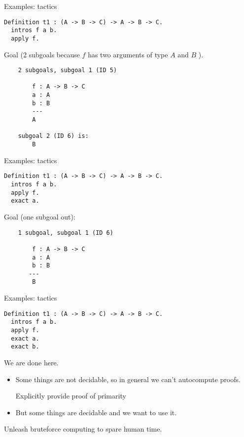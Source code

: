 \documentclass{beamer}
\begin{document}
\begin{frame}[fragile]{Examples: tactics}
    
   \begin{lstlisting}
Definition t1 : (A -> B -> C) -> A -> B -> C.
  intros f a b.
  apply f.
    \end{lstlisting}

    Goal (2 subgoals because $f$ has two arguments of type $A$ and $B$ ).

    \begin{lstlisting}
    2 subgoals, subgoal 1 (ID 5)

        f : A -> B -> C
        a : A
        b : B
        --- 
        A

    subgoal 2 (ID 6) is:
        B
    \end{lstlisting}

\end{frame}


\begin{frame}[fragile]{Examples: tactics}
    \begin{lstlisting}
Definition t1 : (A -> B -> C) -> A -> B -> C.
  intros f a b.
  apply f.
  exact a.
    \end{lstlisting}
    Goal (one subgoal out):

    \begin{lstlisting}
    1 subgoal, subgoal 1 (ID 6)

        f : A -> B -> C
        a : A
        b : B
       --- 
        B

    \end{lstlisting}

\end{frame}

\begin{frame}[fragile]{Examples: tactics}
    \begin{lstlisting}
Definition t1 : (A -> B -> C) -> A -> B -> C.
  intros f a b.
  apply f.
  exact a.
  exact b.
    \end{lstlisting}
We are done here.


\end{frame}

\begin{frame}
    \begin{itemize}
        \item Some things are not decidable, so in general we can't autocompute proofs.

            Explicitly provide proof of primarity
        \item But some things are decidable and we want to use it.
    \end{itemize}

    Unleash bruteforce computing to spare human time.
\end{frame}
\end{document}
